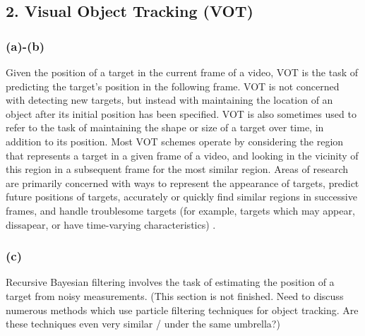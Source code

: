 \documentclass{article}
\begin{document}
\subsection*{2. Visual Object Tracking (VOT)}

\subsubsection*{(a)-(b)}
Given the position of a target in the current frame of a video, VOT is the task of predicting the target's position in the following frame. VOT is not concerned with detecting new targets, but instead with maintaining the location of an object after its initial position has been specified. VOT is also sometimes used to refer to the task of maintaining the shape or size of a target over time, in addition to its position. Most VOT schemes operate by considering the region that represents a target in a given frame of a video, and looking in the vicinity of this region in a subsequent frame for the most similar region. Areas of research are primarily concerned with ways to represent the appearance of targets, predict future positions of targets, accurately or quickly find similar regions in successive frames, and handle troublesome targets (for example, targets which may appear, dissapear, or have time-varying characteristics) \citep{yilmaz_2006}.

\subsubsection*{(c)}
Recursive Bayesian filtering involves the task of estimating the position of a target from noisy measurements. (This section is not finished. Need to discuss numerous methods which use particle filtering techniques for object tracking. Are these techniques even very similar / under the same umbrella?)
\end{document}
